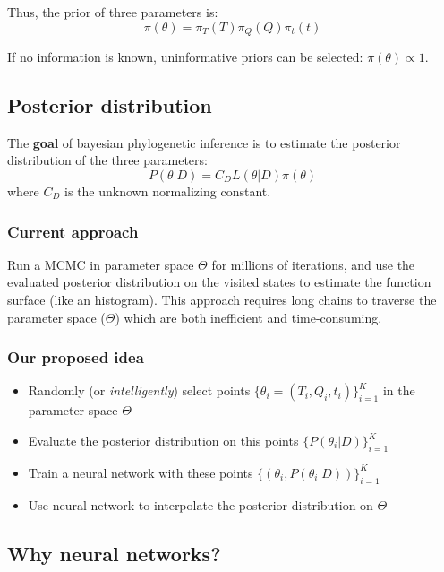 \documentclass[]{article}
\providecommand{\tightlist}{%
  \setlength{\itemsep}{0pt}\setlength{\parskip}{0pt}}
\begin{document}
Thus, the prior of three parameters is: \[
\pi(\theta) = \pi_T(T) \pi_Q(Q) \pi_t(t)
\]

If no information is known, uninformative priors can be selected:
\(\pi(\theta) \propto 1\).

\hypertarget{posterior-distribution}{%
\subsection{Posterior distribution}\label{posterior-distribution}}

The \textbf{goal} of bayesian phylogenetic inference is to estimate the
posterior distribution of the three parameters: \[
P(\theta | D) = C_D L(\theta|D) \pi(\theta)
\] where \(C_D\) is the unknown normalizing constant.

\hypertarget{current-approach}{%
\subsubsection{Current approach}\label{current-approach}}

Run a MCMC in parameter space \(\Theta\) for millions of iterations, and
use the evaluated posterior distribution on the visited states to
estimate the function surface (like an histogram). This approach
requires long chains to traverse the parameter space (\(\Theta\)) which
are both inefficient and time-consuming.

\hypertarget{our-proposed-idea}{%
\subsubsection{Our proposed idea}\label{our-proposed-idea}}

\begin{itemize}
\tightlist
\item
  Randomly (or \emph{intelligently}) select points
  \(\{\theta_i = (T_i,Q_i,t_i)\}_{i=1}^K\) in the parameter space
  \(\Theta\)
\item
  Evaluate the posterior distribution on this points
  \(\{P(\theta_i|D)\}_{i=1}^K\)
\item
  Train a neural network with these points
  \(\{(\theta_i, P(\theta_i|D))\}_{i=1}^K\)
\item
  Use neural network to interpolate the posterior distribution on
  \(\Theta\)
\end{itemize}

\hypertarget{why-neural-networks}{%
\subsection{Why neural networks?}\label{why-neural-networks}}
\end{document}
